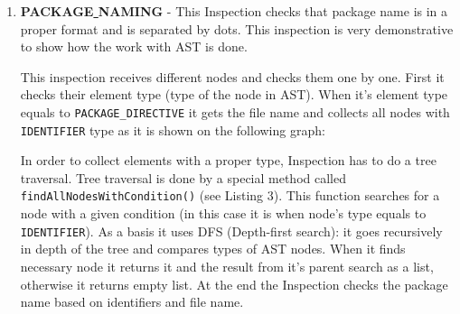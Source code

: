 \begin{enumerate}
    \item \textbf{PACKAGE\underline{ }NAMING} - This Inspection checks that package name is in a proper format and is separated by dots. This inspection is very demonstrative to show how the work with AST is done.

    This inspection receives different nodes and checks them one by one. First it checks their element type (type of the node in AST). When it's element type equals to \texttt{PACKAGE\_DIRECTIVE} it gets the file name and collects all nodes with \texttt{IDENTIFIER} type as it is shown on the following graph:


\begin{center}
\end{center}

In order to collect  elements with a proper type, Inspection has to do a tree traversal. Tree traversal is done by a special method called \texttt{findAllNodesWithCondition()} (see Listing 3). This function searches for a node with a given condition (in this case it is when node's type equals to \texttt{IDENTIFIER}). As a basis it uses DFS (Depth-first search): it goes recursively in depth of the tree and compares types of AST nodes. When it finds necessary node it returns it and the result from it's parent search as a list, otherwise it returns empty list. At the end the Inspection checks the package name based on identifiers and file name.



\end{enumerate}

